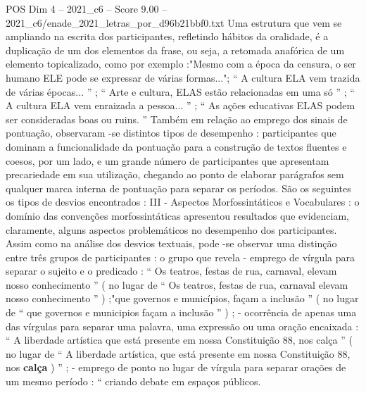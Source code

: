 \begin{textsample}{POS Dim 4 – 2021\_c6 – Score 9.00 – 2021\_c6/enade\_2021\_letras\_por\_d96b21bbf0.txt}
Uma estrutura que vem se ampliando na escrita dos participantes, refletindo hábitos da oralidade, é a duplicação de um dos elementos da frase, ou seja, a retomada anafórica de um elemento topicalizado, como por exemplo :"Mesmo com a época da censura, o ser humano ELE pode se expressar de várias formas..."; “ A cultura ELA vem trazida de várias épocas... ” ; “ Arte e cultura, ELAS estão relacionadas em uma só ” ; “ A cultura ELA vem enraizada a pessoa... ” ; “ As ações educativas ELAS podem ser consideradas boas ou ruins. ” Também em relação ao emprego dos sinais de pontuação, observaram -se distintos tipos de desempenho : participantes que dominam a funcionalidade da pontuação para a construção de textos fluentes e coesos, por um lado, e um grande número de participantes que apresentam precariedade em sua utilização, chegando ao ponto de elaborar parágrafos sem qualquer marca interna de pontuação para separar os períodos.
São os seguintes os tipos de desvios encontrados : III - Aspectos Morfossintáticos e Vocabulares : o domínio das convenções morfossintáticas apresentou resultados que evidenciam, claramente, alguns aspectos problemáticos no desempenho dos participantes.
Assim como na análise dos desvios textuais, pode -se observar uma distinção entre três grupos de participantes : o grupo que revela - emprego de vírgula para separar o sujeito e o predicado : “ Os teatros, festas de rua, carnaval, elevam nosso conhecimento ” ( no lugar de “ Os teatros, festas de rua, carnaval elevam nosso conhecimento ” ) ;"que governos e municípios, façam a inclusão ” ( no lugar de “ que governos e municipios façam a inclusão ” ) ; - ocorrência de apenas uma das vírgulas para separar uma palavra, uma expressão ou uma oração encaixada : “ A liberdade artística que está presente em nossa Constituição 88, nos calça ” ( no lugar de “ A liberdade artística, que está presente em nossa Constituição 88, nos \textbf{calça} ) ” ; - emprego de ponto no lugar de vírgula para separar orações de um mesmo período : “ criando debate em espaços públicos.

\end{textsample}
